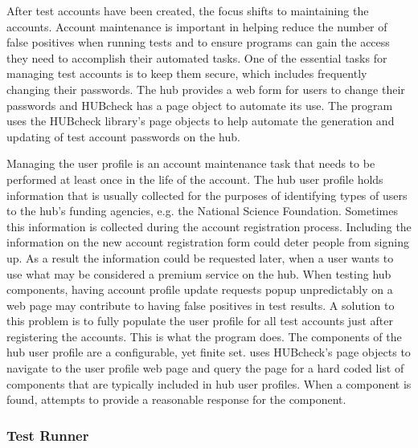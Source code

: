 
After test accounts have been created, the focus shifts to maintaining the
accounts. Account maintenance is important in helping reduce the number of
false positives when running tests and to ensure programs can gain the access
they need to accomplish their automated tasks. One of the essential tasks for
managing test accounts is to keep them secure, which includes frequently
changing their passwords. The hub provides a web form for users to change their
passwords and HUBcheck has a page object to automate its use. The
 program uses the HUBcheck library's page objects to help
automate the generation and updating of test account passwords on the hub.


Managing the user profile is an account maintenance task that needs to be
performed at least once in the life of the account. The hub user profile holds
information that is usually collected for the purposes of identifying types of
users to the hub's funding agencies, e.g. the National Science Foundation.
Sometimes this information is collected during the account registration
process. Including the information on the new account registration form could
deter people from signing up. As a result the information could be requested
later, when a user wants to use what may be considered a premium service on the
hub. When testing hub components, having account profile update requests popup
unpredictably on a web page may contribute to having false positives in test
results. A solution to this problem is to fully populate the user profile for
all test accounts just after registering the accounts. This is what the
 program does. The components of the hub user profile are
a configurable, yet finite set.  uses HUBcheck's page
objects to navigate to the user profile web page and query the page for a hard
coded list of components that are typically included in hub user profiles. When
a component is found,  attempts to provide a reasonable
response for the component.


\subsubsection{Test Runner}
\label{sssec:hubcheck_tools_examples_hctestrunner}

